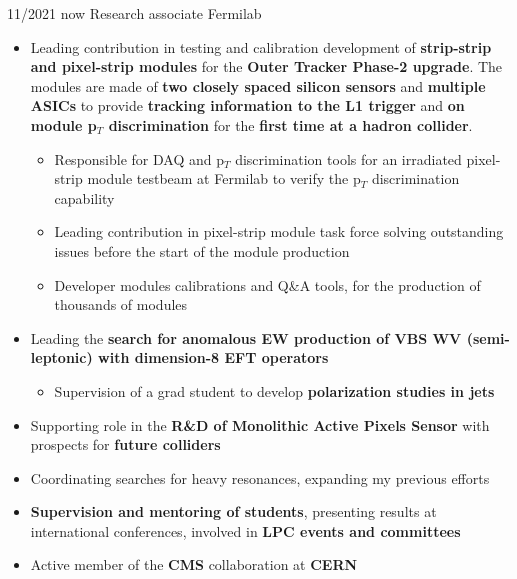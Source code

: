   \position
  {11/2021  \textemdash{} now} 
   {Research associate}
   {Fermilab}
{\begin{itemize}

\item Leading contribution in testing and calibration development of {\bf strip-strip and pixel-strip modules} for the {\bf Outer Tracker Phase-2 upgrade}. The modules are made of {\bf two closely spaced silicon sensors} and {\bf multiple ASICs} to provide {\bf tracking information to the L1 trigger} and {\bf on module p$_{T}$ discrimination} for the {\bf first time at a hadron collider}.
\begin{itemize}
\item Responsible for DAQ and p$_{T}$ discrimination tools for an irradiated pixel-strip module testbeam at Fermilab to verify the p$_{T}$ discrimination capability
\item Leading contribution in pixel-strip module task force solving outstanding issues before the start of the module production
\item Developer modules calibrations and Q\&A tools, for the production of thousands of modules
\end{itemize}
\item Leading the {\bf search for anomalous EW production of VBS WV (semi-leptonic) with dimension-8 EFT operators}
\begin{itemize}
\item Supervision of a grad student to develop {\bf polarization studies in jets} %
\end{itemize}
\item Supporting role in the {\bf R\&D of Monolithic Active Pixels Sensor} with prospects for {\bf future colliders}
\item Coordinating searches for heavy resonances, expanding my previous efforts
\item {\bf Supervision and mentoring of students}, presenting results at international conferences,  involved in {\bf LPC events and committees}
\item Active member of the {\bf CMS} collaboration at {\bf CERN}

\end{itemize}
}

